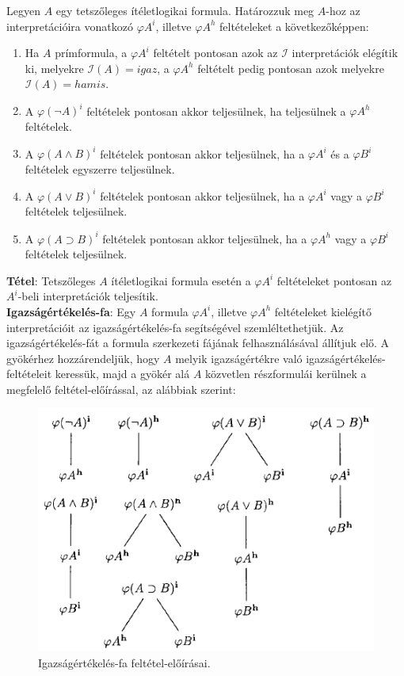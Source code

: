 \documentclass[margin=0px]{article}
\begin{document}
	Legyen $A$ egy tetszőleges ítéletlogikai formula. Határozzuk meg $A$-hoz az interpretációira vonatkozó $\varphi A^{i}$, illetve
	$\varphi A^{h}$ feltételeket a következőképpen:
	
	\begin{enumerate}
		\item	Ha $A$ prímformula, a $\varphi A^{i}$ feltételt pontosan azok az $\mathcal{I}$ interpretációk elégítik ki,  melyekre
		$\mathcal{I}(A)=igaz$, a $\varphi A^{h}$ feltételt pedig pontosan azok melyekre	$\mathcal{I}(A)=hamis$.
		
		\item	A $\varphi (\neg A)^{i}$ feltételek pontosan akkor teljesülnek, ha teljesülnek a $\varphi A^{h}$ feltételek.
		
		\item	A $\varphi (A \wedge B)^{i}$ feltételek pontosan akkor teljesülnek, ha a $\varphi A^{i}$ és a $\varphi B^{i}$ feltételek egyszerre teljesülnek.
		
		\item	A $\varphi (A \vee B)^{i}$ feltételek pontosan akkor teljesülnek, ha a $\varphi A^{i}$ vagy a $\varphi B^{i}$ feltételek teljesülnek.
		
		\item	A $\varphi (A \supset B)^{i}$ feltételek pontosan akkor teljesülnek, ha a $\varphi A^{h}$ vagy a $\varphi B^{i}$ feltételek teljesülnek.
	\end{enumerate}	
	
	\noindent \textbf{Tétel}: Tetszőleges $A$ ítéletlogikai formula esetén a  $\varphi A^{i}$ feltételeket pontosan az  $A^{i}$-beli
	interpretációk teljesítik.\\
	
	\noindent \textbf{Igazságértékelés-fa}:  Egy $A$ formula $\varphi A^{i}$, illetve $\varphi A^{h}$ feltételeket kielégítő interpretációit
	az igazságértékelés-fa segítségével szemléltethetjük. Az igazságértékelés-fát a formula szerkezeti fájának felhasználásával állítjuk elő.
	A gyökérhez hozzárendeljük, hogy $A$ melyik igazságértékre való igazságértékelés-feltételeit keressük, majd a gyökér alá $A$ közvetlen részformulái kerülnek a megfelelő feltétel-előírással, az alábbiak szerint:
	
	\begin{figure}[H]
		\centering
		\includegraphics[width=0.7\linewidth]{img/igazsagertfa}
		\caption{Igazságértékelés-fa feltétel-előírásai.}
		\label{fig:igazsagertfa}
	\end{figure}
	
\end{document}

